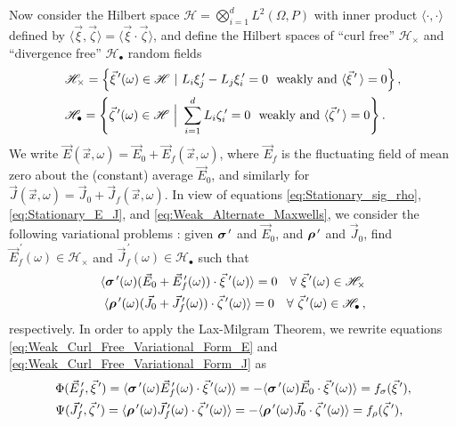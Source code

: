 \documentclass[11pt]{amsart}
\newcommand\bsig{\mbox{\boldmath${\sigma}$}}
\newcommand\brho{\mbox{\boldmath${\rho}$}}
\begin{document}
Now consider the Hilbert space $\mathscr{H}=\bigotimes_{i=1}^dL^2(\Omega,P)$ with
inner product $\langle\cdot,\cdot\rangle$ defined by
$\langle\vec{\xi},\vec{\zeta}\rangle=\langle\vec{\xi}\cdot\vec{\zeta}\rangle$, and define the Hilbert spaces
of ``curl free'' $\mathscr{H}_\times$ and ``divergence free''
$\mathscr{H}_{\bullet}$ random fields \cite{Golden:CMP-473}   
%
\begin{align}\label{eq:curlfreeHilbert}
  &\mathscr{H}_\times=
  \left\{\vec{\xi}^{\,\prime}(\omega)\in \mathscr{H} \ | \ L_i\xi_j^{\,\prime}-L_j\xi_i^{\,\prime}=0 \ \text{ weakly and }
    \langle\vec{\xi}^{\,\prime}\,\rangle=0
  \right\}, \\
&\mathscr{H}_{\bullet}=
\left\{\vec{\zeta}^{\,\prime}(\omega)\in \mathscr{H} \ \Big| \ \sum_{i=1}^dL_i\zeta_i^{\,\prime}=0 \ \text{ weakly and }
    \langle\vec{\zeta}^{\,\prime}\,\rangle=0\right\}.\notag 
\end{align}  
%
We write $\vec{E}(\vec{x},\omega)=\vec{E}_0+\vec{E}_f(\vec{x},\omega)$, where
$\vec{E}_f$ is the fluctuating field of mean zero about the (constant)
average $\vec{E}_0$, and similarly for
$\vec{J}(\vec{x},\omega)=\vec{J}_0+\vec{J}_f(\vec{x},\omega)$. 
In view of equations \eqref{eq:Stationary_sig_rho},
\eqref{eq:Stationary_E_J}, and \eqref{eq:Weak_Alternate_Maxwells}, we
consider the following variational problems
\cite{Golden:CMP-473}: given $\bsig^{\,\prime}$ and $\vec{E}_0$, and
$\brho^{\,\prime}$ and $\vec{J}_0$, find $\vec{E}_f^{\,\prime}(\omega)\in\mathscr{H}_\times$
and $\vec{J}_f^{\,\prime}(\omega)\in\mathscr{H}_\bullet$ such that         
%
\begin{align} 
  \label{eq:Weak_Curl_Free_Variational_Form_E}
     \langle\bsig^{\,\prime}(\omega)(\vec{E}_0+\vec{E}_f^{\,\prime}(\omega))\cdot\vec{\xi}^{\;\prime}(\omega)\rangle=0
      \quad  \forall \ \vec{\xi}^{\,\prime}(\omega)\in\mathscr{H}_\times
  \\
  \label{eq:Weak_Curl_Free_Variational_Form_J}
     \langle\brho^{\,\prime}(\omega)(\vec{J}_0+\vec{J}_f^{\,\prime}(\omega))\cdot\vec{\zeta}^{\,\prime}(\omega)\rangle=0
      \quad  \forall \ \vec{\zeta}^{\,\prime}(\omega)\in\mathscr{H}_{\bullet}\,,
\end{align}
%
respectively. In order to apply the Lax-Milgram Theorem, we
rewrite equations \eqref{eq:Weak_Curl_Free_Variational_Form_E} and
\eqref{eq:Weak_Curl_Free_Variational_Form_J} as
%
\begin{align}
  \label{eq:Bilinear_functional_E}
   &\Phi(\vec{E}_f^{\,\prime},\vec{\xi}^{\,\prime})
     =\langle\bsig^{\,\prime}(\omega)\vec{E}_f^{\,\prime}(\omega)\cdot\vec{\xi}^{\,\prime}(\omega)\rangle
     =-\langle\bsig^{\,\prime}(\omega)\vec{E}_0\cdot\vec{\xi}^{\,\prime}(\omega)\rangle
     =f_\sigma(\vec{\xi}^{\,\prime}),
  \\
  \label{eq:Bilinear_functional_J}
  &\Psi(\vec{J}_f^{\,\prime},\vec{\zeta}^{\,\prime})
     =\langle\brho^{\,\prime}(\omega)\vec{J}_f^{\,\prime}(\omega)\cdot\vec{\zeta}^{\,\prime}(\omega)\rangle
     =-\langle\brho^{\,\prime}(\omega)\vec{J}_0\cdot\vec{\zeta}^{\,\prime}(\omega)\rangle
     =f_\rho(\vec{\zeta}^{\,\prime}),
\end{align}
\end{document}

